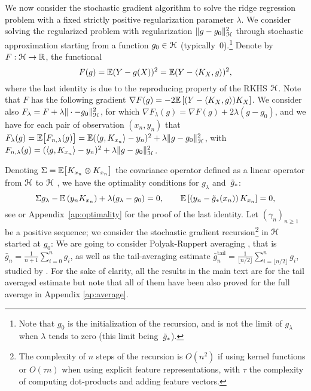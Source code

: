 \documentclass[final]{colt2018} %
\begin{document}
We now consider the stochastic gradient algorithm to solve the ridge regression problem with a fixed  strictly positive regularization parameter $\lambda$. 
We consider solving the regularized problem with regularization $\|  g- g_0 \|_{{\mathcal H}}^2$ through stochastic approximation starting from a function $g_0 \in {\mathcal H}$ (typically~$0$).\footnote{Note that $g_0$ is the initialization of the recursion, and is not the limit of $g_\lambda$ when $\lambda$ tends to zero (this limit being~$\tilde{g}_*$).} Denote by $F: \mathcal H \to \mathbb R$, the functional
$$ F(g)= {\mathbb E} (Y - g(X) )^2 = {\mathbb E}( Y - \langle K_X , g \rangle  )^2,$$
where the last identity is due to the reproducing property of the RKHS $\mathcal H$.
Note that $F$ has the following gradient   $\nabla F(g) = - 2 {\mathbb E} \left[  (Y - \langle K_X , g \rangle)K_X  \right]$. We consider also  $F_\lambda = F + \lambda \| \cdot - g_0\|_{\mathcal H}^2$, for which $\nabla F_\lambda(g) = \nabla F(g) + 2 \lambda (g - g_0)$, and we have for each pair of observation $(x_n,y_n)$ that $F_\lambda (g)  = {\mathbb E} \big[ F_{n,\lambda}(g)\big] = {\mathbb E} (\langle g, K_{x_n}\rangle-y_n)^2 + \lambda \|g-g_0\|_{\mathcal H}^2 $, with
 $F_{n,\lambda}(g) = (\langle g, K_{x_n}\rangle-y_n)^2 + \lambda \|g-g_0\|_{\mathcal H}^2$.
 
 Denoting $\Sigma = {\mathbb E} \big[ K_{x_n} \otimes K_{x_n} \big]$ the covariance operator defined as a linear operator from ${\mathcal H}$ to ${\mathcal H}$ \citep[see][and references therein]{fukumizu2004dimensionality}, we have the optimality conditions for $g_\lambda$ and~$\tilde{g}_*$:
$$\Sigma g_\lambda - {\mathbb E} \left(y_n K_{x_n}\right) + \lambda ( g_\lambda - g_0) = 0,  \qquad {\mathbb E} \left[ \left(y_n - \tilde{g}_*(x_n)\right)K_{x_n}\right] = 0,$$
see \citet{caponnetto2007optimal} or Appendix~\ref{ap:optimality} for the proof of the last identity. 
%
 Let $(\gamma_n)_{n \geqslant 1}$ be a positive sequence; we consider the stochastic gradient recursion\footnote{The complexity of $n$ steps of the recursion is $O(n^2)$ if using kernel functions or $O(\tau n)$ when using explicit feature representations, with $\tau$ the complexity of computing dot-products  and adding feature vectors.} in ${\mathcal H}$ started at $g_0$:
We are going to consider Polyak-Ruppert averaging \citep{polyak1992acceleration}, that is $\bar{g}_n = \frac{1}{n+1} \sum_{i=0}^{n} g_i$, as well as the tail-averaging estimate $\bar{g}_n^{\textrm {tail}} = \frac{1}{\lfloor n/2 \rfloor} \sum_{i=\lfloor n/2 \rfloor}^{n} g_i$, studied by \citet{jain2016parallelizing}. For the sake of clarity, all the results in the main text are for the tail averaged estimate but note that all of them have been also proved for the full average in Appendix \ref{ap:average}.
\end{document}
